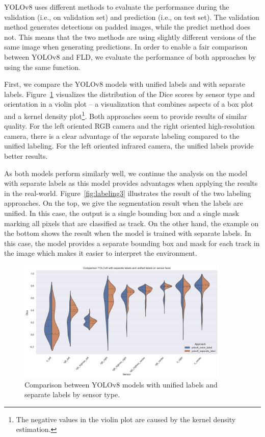 \documentclass[Master,MDS,english]{BASE/twbook} %
\begin{document}
YOLOv8 uses different methods to evaluate the performance during the validation (i.e., on validation set) and prediction (i.e., on test set). The validation method generates detections on padded images, while the predict method does not. This means that the two methods are using slightly different versions of the same image when generating predictions. In order to enable a fair comparison between YOLOv8 and FLD, we evaluate the performance of both approaches by using the same function.

First, we compare the YOLOv8 models with unified labels and with separate labels. Figure~\ref{fig:yolo_vs_yolo} visualizes the distribution of the Dice scores by sensor type and orientation in a violin plot -- a visualization that combines aspects of a box plot and a kernel density plot\footnote{The negative values in the violin plot are caused by the kernel density estimation.}. 
Both approaches seem to provide results of similar quality. 
For the left oriented RGB camera and the right oriented high-resolution camera, there is a clear advantage of the separate labeling compared to the unified labeling. For the left oriented infrared camera, the unified labels provide better results.

As both models perform similarly well, we continue the analysis on the model with separate labels as this model provides advantages when applying the results in the real-world. 
Figure~\ref{fig:labeling3} illustrates the result of the two labeling approaches. 
On the top, we give the segmentation result when the labels are unified. In this case, the output is a single bounding box and a single mask marking all pixels that are classified as track. On the other hand, the example on the bottom shows the result when the model is trained with separate labels. In this case, the model provides a separate bounding box and mask for each track in the image which makes it easier to interpret the environment.

 

\begin{figure}[H]
\centering
\includegraphics[width=0.9\textwidth]{images/results/violin_plot_yolo}
\caption{Comparison between YOLOv8 models with unified labels and separate labels by sensor type. }
\label{fig:yolo_vs_yolo}
\end{figure}
\end{document}
